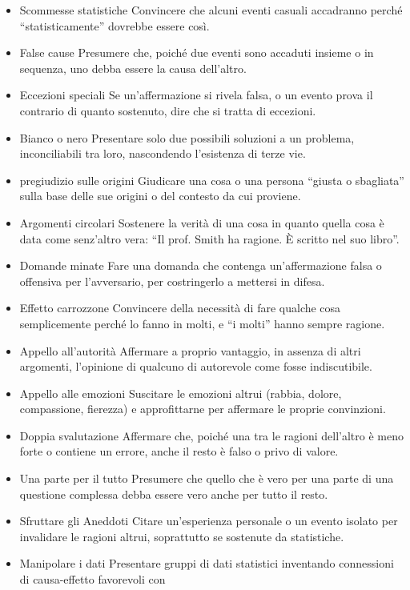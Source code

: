 \documentclass[12pt]{book} %
\begin{document}
\begin{itemize}
\item Scommesse statistiche Convincere che alcuni eventi casuali accadranno perché “statisticamente” dovrebbe essere
così.
\item False cause Presumere che, poiché due eventi sono accaduti insieme o in sequenza, uno debba essere la causa
dell'altro.
\item Eccezioni speciali Se un'affermazione si rivela falsa, o un evento prova il contrario di
quanto sostenuto, dire che si tratta di eccezioni.
\item Bianco o nero Presentare solo due possibili soluzioni a un problema, inconciliabili tra loro, nascondendo
l'esistenza di terze vie.
\item pregiudizio sulle origini Giudicare una cosa o una persona “giusta o sbagliata” sulla base delle sue origini o del
contesto da cui proviene.
\item Argomenti circolari Sostenere la verità di una cosa in quanto quella cosa è data come
senz'altro vera: “Il prof. Smith ha ragione. È scritto nel suo libro”.
\item Domande minate Fare una domanda che contenga un'affermazione falsa o offensiva per
l'avversario, per costringerlo a mettersi in difesa.
\item Effetto carrozzone Convincere della necessità di fare qualche cosa semplicemente perché lo fanno in molti, e “i
molti” hanno sempre ragione.
\item Appello all'autorità Affermare a proprio vantaggio, in assenza di altri argomenti,
l'opinione di qualcuno di autorevole come fosse indiscutibile.
\item Appello alle emozioni Suscitare le emozioni altrui (rabbia, dolore, compassione, fierezza) e approfittarne per
affermare le proprie convinzioni.
\item Doppia svalutazione Affermare che, poiché una tra le ragioni dell'altro è meno forte o
contiene un errore, anche il resto è falso o privo di valore.
\item Una parte per il tutto Presumere che quello che è vero per una parte di una questione complessa debba essere vero
anche per tutto il resto.
\item Sfruttare gli Aneddoti Citare un'esperienza personale o un evento isolato per invalidare le
ragioni altrui, soprattutto se sostenute da statistiche.
\item Manipolare i dati Presentare gruppi di dati statistici inventando connessioni di causa-effetto favorevoli con

\end{itemize}
\end{document}
